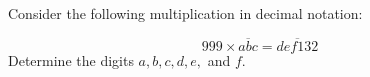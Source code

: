 Consider the following multiplication in decimal notation:

\[
999 \times \overline{abc} = \overline{def132}
\]Determine the digits $a, b, c, d, e,$ and $f$.
